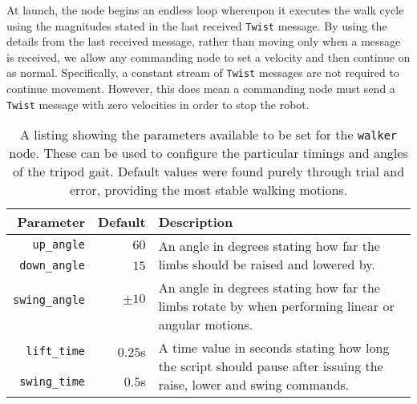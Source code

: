 At launch, the node begins an endless loop whereupon it executes the walk cycle using the magnitudes stated in the last received \texttt{Twist} message. By using the details from the last received message, rather than moving only when a message is received, we allow any commanding node to set a velocity and then continue on as normal. Specifically, a constant stream of \texttt{Twist} messages are not required to continue movement. However, this does mean a commanding node must send a \texttt{Twist} message with zero velocities in order to stop the robot. 

\begin{table}[h!]
	\centering
	\begin{tabular}{ r r p{10cm} }
		\toprule
		\textbf{Parameter} & 
		\textbf{Default} & 
		\textbf{Description} \\
		\midrule

		\texttt{up\_angle} & 
		$60$\textdegree{} & 
		\multirow{2}{10cm}{An angle in degrees stating how far the limbs should be raised and lowered by.} \\

		\texttt{down\_angle} & 
		$15$\textdegree{} & \\

		\hline

		\texttt{swing\_angle} & 
		$\pm10$\textdegree{} & 
		\multirow{2}{10cm}{An angle in degrees stating how far the limbs rotate by when performing linear or angular motions.} \\

		& & \\
		
		\hline

		\texttt{lift\_time} & 
		$0.25$s & 
		\multirow{2}{10cm}{A time value in seconds stating how long the script should pause after issuing the raise, lower and swing commands.} \\

		\texttt{swing\_time} & 
		$0.5$s & 
		\\
		\bottomrule
	\end{tabular}
	\caption{A listing showing the parameters available to be set for the \texttt{walker} node. These can be used to configure the particular timings and angles of the tripod gait. Default values were found purely through trial and error, providing the most stable walking motions.}
	\label{tab:walker_params}
\end{table}

